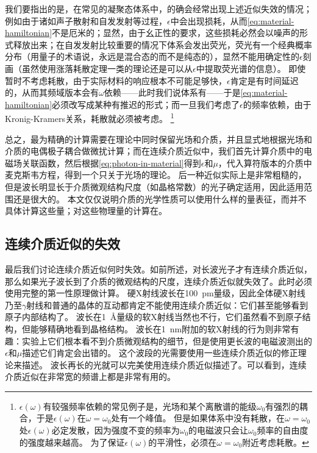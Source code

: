 我们要指出的是，在常见的凝聚态体系中，的确会经常出现上述近似失效的情况；
例如由于诸如声子散射和自发发射等过程，$\epsilon$中会出现损耗，从而\eqref{eq:material-hamiltonian}不是厄米的；显然，由于幺正性的要求，这些损耗必然会以噪声的形式释放出来；在自发发射比较重要的情况下体系会发出荧光，荧光有一个经典概率分布（用量子的术语说，永远是混合态的而不是纯态的），显然不能用确定性的$\epsilon$刻画（虽然使用涨落耗散定理一类的理论还是可以从$\epsilon$中提取荧光谱的信息）。
即使暂时不考虑耗散，由于实际材料的响应根本不可能足够快，$\epsilon$肯定是有时间延迟的，从而其频域版本会有$\omega$依赖——此时我们说体系有——于是\eqref{eq:material-hamiltonian}必须改写成某种有推迟的形式；而一旦我们考虑了$\epsilon$的频率依赖，由于Kronig-Kramers关系，耗散就必须被考虑。%
\footnote{
    $\epsilon(\omega)$有较强频率依赖的常见例子是，光场和某个离散谱的能级$\omega_0$有强烈的耦合，于是$\epsilon(\omega)$在$\omega = \omega_0$处有一个峰值。
    但是如果体系中没有耗散，在$\omega = \omega_0$处$\epsilon(\omega)$必定发散，因为强度不变的频率为$\omega_0$的电磁波只会让$\omega_0$频率的自由度的强度越来越高。
    为了保证$\epsilon(\omega)$的平滑性，必须在$\omega = \omega_0$附近考虑耗散。
}

总之，最为精确的计算需要在理论中同时保留光场和介质，并且显式地根据光场和介质的电偶极子耦合做微扰计算；而在连续介质近似中，我们首先计算介质中的电磁场关联函数，然后根据\eqref{eq:photon-in-material}得到$\epsilon$和$\mu$，代入算符版本的介质中麦克斯韦方程，得到一个只关于光场的理论。
后一种近似实际上是非常粗糙的，但是波长明显长于介质微观结构尺度（如晶格常数）的光子确定适用，因此适用范围还是很大的。
本文仅仅说明介质的光学性质可以使用什么样的量表征，而并不具体计算这些量；对这些物理量的计算在。

\subsection{连续介质近似的失效}

最后我们讨论连续介质近似何时失效。如前所述，对长波光子才有连续介质近似，那么如果光子波长到了介质的微观结构的尺度，连续介质近似就失效了。此时必须使用完整的第一性原理做计算。
硬X射线波长在\SI{100}{pm}量级，因此全体硬X射线乃至$\gamma$射线和普通的晶体的互动都肯定不能使用连续介质近似：它们甚至能够看到原子内部结构了。
波长在\SI{1}{\angstrom}量级的软X射线当然也不行，它们虽然看不到原子结构，但能够精确地看到晶格结构。
波长在\SI{1}{nm}附加的软X射线的行为则非常有趣：实验上它们根本看不到介质微观结构的细节，但是使用更长波的电磁波测出的$\epsilon$和$\mu$描述它们肯定会出错的。
这个波段的光需要使用一些连续介质近似的修正理论来描述。
波长再长的光就可以完美使用连续介质近似描述了。可以看到，连续介质近似在非常宽的频谱上都是非常有用的。

